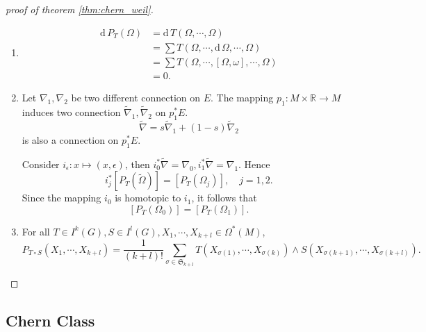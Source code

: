 \documentclass[11pt]{homework}
\theoremstyle{indented}
\begin{document}
\begin{proof}[proof of theorem \ref{thm:chern_weil}]
    \begin{enumerate}
        \item 
        \begin{align*}
            \mathrm d \, P_{T}\left(\Omega\right) &= \mathrm d \, T(\Omega, \cdots, \Omega) \\
            &= \sum T(\Omega, \cdots, \mathrm d \, \Omega, \cdots, \Omega) \\
            &= \sum T(\Omega, \cdots, \left[\Omega, \omega \right], \cdots, \Omega) \\
            &=0.
        \end{align*}
        \item 
        Let $\nabla_1, \nabla_2$ be two different connection on $E$. The mapping $p_1 : M \times \mathbb{R} \to M$ induces two connection $\tilde \nabla_1, \tilde \nabla_2$ on $p_1^\ast E$.
        \begin{equation*}
            \tilde \nabla = s \tilde \nabla_1 + (1-s) \tilde \nabla_2
        \end{equation*}
        is also a connection on $p_1^\ast E$.
        
        Consider $i_\epsilon: x\mapsto (x, \epsilon)$, then $i_0^\ast \tilde \nabla = \nabla_0, i_1^\ast \tilde \nabla = \nabla_1$. Hence
        \begin{equation*}
            i_j^\ast \left[P_T\left(\tilde \Omega\right)\right] = \left[P_T\left(\Omega_j\right)\right], \quad j=1,2.
        \end{equation*}
        Since the mapping $i_0$ is homotopic to $i_1$, it follows that
        \begin{equation*}
            \left[P_T\left(\Omega_0\right)\right] = \left[P_T\left(\Omega_1\right)\right].
        \end{equation*}
        \item For all $T\in I^{k}(G), S \in I^{l}(G), X_1, \cdots, X_{k+l} \in \Omega^\ast (M)$,
        \begin{equation*}
            P_{T\circ S}(X_1, \cdots, X_{k+l}) = \frac{1}{(k+l)!} \sum_{\sigma \in \mathfrak{S}_{k+l}} T(X_{\sigma(1)}, \cdots, X_{\sigma(k)}) \wedge S(X_{\sigma(k+1)}, \cdots, X_{\sigma(k+l)}).
        \end{equation*}
    \end{enumerate}
\end{proof}

\subsection{Chern Class}
\end{document}
